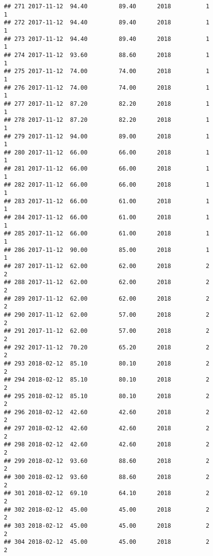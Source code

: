 \documentclass[]{article}
\begin{document}
\begin{verbatim}
## 271 2017-11-12  94.40         89.40      2018          1                 1
## 272 2017-11-12  94.40         89.40      2018          1                 1
## 273 2017-11-12  94.40         89.40      2018          1                 1
## 274 2017-11-12  93.60         88.60      2018          1                 1
## 275 2017-11-12  74.00         74.00      2018          1                 1
## 276 2017-11-12  74.00         74.00      2018          1                 1
## 277 2017-11-12  87.20         82.20      2018          1                 1
## 278 2017-11-12  87.20         82.20      2018          1                 1
## 279 2017-11-12  94.00         89.00      2018          1                 1
## 280 2017-11-12  66.00         66.00      2018          1                 1
## 281 2017-11-12  66.00         66.00      2018          1                 1
## 282 2017-11-12  66.00         66.00      2018          1                 1
## 283 2017-11-12  66.00         61.00      2018          1                 1
## 284 2017-11-12  66.00         61.00      2018          1                 1
## 285 2017-11-12  66.00         61.00      2018          1                 1
## 286 2017-11-12  90.00         85.00      2018          1                 1
## 287 2017-11-12  62.00         62.00      2018          2                 2
## 288 2017-11-12  62.00         62.00      2018          2                 2
## 289 2017-11-12  62.00         62.00      2018          2                 2
## 290 2017-11-12  62.00         57.00      2018          2                 2
## 291 2017-11-12  62.00         57.00      2018          2                 2
## 292 2017-11-12  70.20         65.20      2018          2                 2
## 293 2018-02-12  85.10         80.10      2018          2                 2
## 294 2018-02-12  85.10         80.10      2018          2                 2
## 295 2018-02-12  85.10         80.10      2018          2                 2
## 296 2018-02-12  42.60         42.60      2018          2                 2
## 297 2018-02-12  42.60         42.60      2018          2                 2
## 298 2018-02-12  42.60         42.60      2018          2                 2
## 299 2018-02-12  93.60         88.60      2018          2                 2
## 300 2018-02-12  93.60         88.60      2018          2                 2
## 301 2018-02-12  69.10         64.10      2018          2                 2
## 302 2018-02-12  45.00         45.00      2018          2                 2
## 303 2018-02-12  45.00         45.00      2018          2                 2
## 304 2018-02-12  45.00         45.00      2018          2                 2

\end{verbatim}
\end{document}
